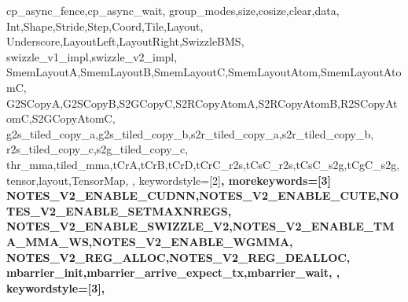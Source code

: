 {{    cp_async_fence,cp_async_wait,
    group_modes,size,cosize,clear,data,
    Int,Shape,Stride,Step,Coord,Tile,Layout,
    Underscore,LayoutLeft,LayoutRight,SwizzleBMS,
    swizzle_v1_impl,swizzle_v2_impl,
    SmemLayoutA,SmemLayoutB,SmemLayoutC,SmemLayoutAtom,SmemLayoutAtomC,
    G2SCopyA,G2SCopyB,S2GCopyC,S2RCopyAtomA,S2RCopyAtomB,R2SCopyAtomC,S2GCopyAtomC,
    g2s_tiled_copy_a,g2s_tiled_copy_b,s2r_tiled_copy_a,s2r_tiled_copy_b,
    r2s_tiled_copy_c,s2g_tiled_copy_c,
    thr_mma,tiled_mma,tCrA,tCrB,tCrD,tCrC_r2s,tCsC_r2s,tCsC_s2g,tCgC_s2g,
    tensor,layout,TensorMap,
  },
  keywordstyle=[2]\bfseries\color{vscEmphasis},
  morekeywords=[3]{
    NOTES_V2_ENABLE_CUDNN,NOTES_V2_ENABLE_CUTE,NOTES_V2_ENABLE_SETMAXNREGS,
    NOTES_V2_ENABLE_SWIZZLE_V2,NOTES_V2_ENABLE_TMA_MMA_WS,NOTES_V2_ENABLE_WGMMA,
    NOTES_V2_REG_ALLOC,NOTES_V2_REG_DEALLOC,
    mbarrier_init,mbarrier_arrive_expect_tx,mbarrier_wait,
  },
  keywordstyle=[3]\bfseries\color{vscAccent},
}

